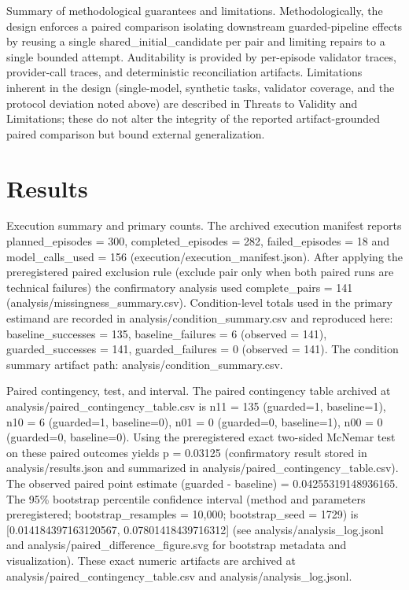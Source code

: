 \documentclass[conference]{IEEEtran}
\begin{document}
Summary of methodological guarantees and limitations. Methodologically, the design enforces a paired comparison isolating downstream guarded-pipeline effects by reusing a single shared\_initial\_candidate per pair and limiting repairs to a single bounded attempt. Auditability is provided by per-episode validator traces, provider-call traces, and deterministic reconciliation artifacts. Limitations inherent in the design (single-model, synthetic tasks, validator coverage, and the protocol deviation noted above) are described in Threats to Validity and Limitations; these do not alter the integrity of the reported artifact-grounded paired comparison but bound external generalization.

\section{Results}
Execution summary and primary counts. The archived execution manifest reports planned\_episodes = 300, completed\_episodes = 282, failed\_episodes = 18 and model\_calls\_used = 156 (execution/execution\_manifest.json). After applying the preregistered paired exclusion rule (exclude pair only when both paired runs are technical failures) the confirmatory analysis used complete\_pairs = 141 (analysis/missingness\_summary.csv). Condition-level totals used in the primary estimand are recorded in analysis/condition\_summary.csv and reproduced here: baseline\_successes = 135, baseline\_failures = 6 (observed = 141), guarded\_successes = 141, guarded\_failures = 0 (observed = 141). The condition summary artifact path: analysis/condition\_summary.csv.

Paired contingency, test, and interval. The paired contingency table archived at analysis/paired\_contingency\_table.csv is
n11 = 135 (guarded=1, baseline=1),
n10 = 6   (guarded=1, baseline=0),
n01 = 0   (guarded=0, baseline=1),
n00 = 0   (guarded=0, baseline=0).
Using the preregistered exact two-sided McNemar test on these paired outcomes yields p = 0.03125 (confirmatory result stored in analysis/results.json and summarized in analysis/paired\_contingency\_table.csv). The observed paired point estimate (guarded - baseline) = 0.04255319148936165. The 95\% bootstrap percentile confidence interval (method and parameters preregistered; bootstrap\_resamples = 10,000; bootstrap\_seed = 1729) is [0.014184397163120567, 0.07801418439716312] (see analysis/analysis\_log.jsonl and analysis/paired\_difference\_figure.svg for bootstrap metadata and visualization). These exact numeric artifacts are archived at analysis/paired\_contingency\_table.csv and analysis/analysis\_log.jsonl.
\end{document}
